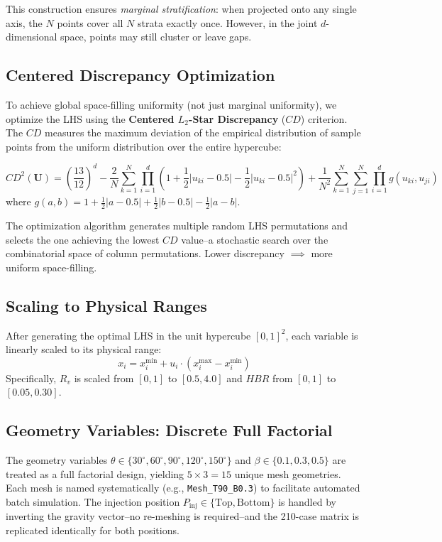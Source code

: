 \documentclass[12pt, a4paper]{report}
\begin{document}
\noindent This construction ensures \textit{marginal stratification}: when projected onto any single axis, the $N$ points cover all $N$ strata exactly once. However, in the joint $d$-dimensional space, points may still cluster or leave gaps.

\subsection{Centered Discrepancy Optimization}
To achieve global space-filling uniformity (not just marginal uniformity), we optimize the LHS using the \textbf{Centered $L_2$-Star Discrepancy} ($CD$) criterion. The $CD$ measures the maximum deviation of the empirical distribution of sample points from the uniform distribution over the entire hypercube:

\begin{equation}
    CD^2(\mathbf{U}) = \left(\frac{13}{12}\right)^d - \frac{2}{N} \sum_{k=1}^{N} \prod_{i=1}^{d} \left(1 + \frac{1}{2}|u_{ki} - 0.5| - \frac{1}{2}|u_{ki} - 0.5|^2 \right) + \frac{1}{N^2} \sum_{k=1}^{N} \sum_{j=1}^{N} \prod_{i=1}^{d} g(u_{ki}, u_{ji})
    \label{eq:cd}
\end{equation}
where $g(a, b) = 1 + \frac{1}{2}|a - 0.5| + \frac{1}{2}|b - 0.5| - \frac{1}{2}|a - b|$.

\noindent The optimization algorithm generates multiple random LHS permutations and selects the one achieving the lowest $CD$ value--a stochastic search over the combinatorial space of column permutations. Lower discrepancy $\implies$ more uniform space-filling.

\subsection{Scaling to Physical Ranges}
After generating the optimal LHS in the unit hypercube $[0,1]^2$, each variable is linearly scaled to its physical range:
\begin{equation}
    x_i = x_i^{\min} + u_i \cdot (x_i^{\max} - x_i^{\min})
\end{equation}
Specifically, $R_v$ is scaled from $[0,1]$ to $[0.5, 4.0]$ and $HBR$ from $[0,1]$ to $[0.05, 0.30]$.

\subsection{Geometry Variables: Discrete Full Factorial}
The geometry variables $\theta \in \{30^\circ, 60^\circ, 90^\circ, 120^\circ, 150^\circ\}$ and $\beta \in \{0.1, 0.3, 0.5\}$ are treated as a full factorial design, yielding $5 \times 3 = 15$ unique mesh geometries. Each mesh is named systematically (e.g., \texttt{Mesh\_T90\_B0.3}) to facilitate automated batch simulation. The injection position $P_{\text{inj}} \in \{\text{Top}, \text{Bottom}\}$ is handled by inverting the gravity vector--no re-meshing is required--and the 210-case matrix is replicated identically for both positions.
\end{document}
